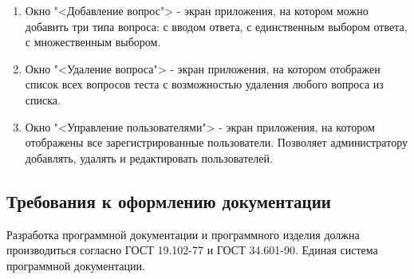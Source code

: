 \begin{enumerate}
	\item Окно "<Добавление вопрос"> - экран приложения, на котором можно добавить три типа вопроса: с вводом ответа, с единственным выбором ответа, с множественным выбором.
	\item Окно "<Удаление вопроса"> - экран приложения, на котором отображен список всех вопросов теста с возможностью удаления любого вопроса из списка.
	\item Окно "<Управление пользователями"> - экран приложения, на котором отображены все зарегистрированные пользователи. Позволяет администратору добавлять, удалять и редактировать пользователей.
\end{enumerate}

\subsection{Требования к оформлению документации}

Разработка программной документации и программного изделия должна производиться согласно ГОСТ 19.102-77 и ГОСТ 34.601-90. Единая система программной документации.
